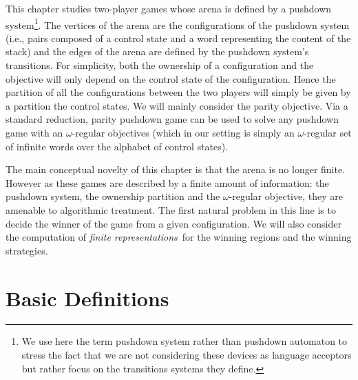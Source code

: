 

This chapter studies two-player games whose arena is defined by a pushdown system\footnote{We use here the term pushdown system rather than pushdown automaton to stress the fact that we are not considering these devices as language acceptors but rather focus on the transitions systems they define.}. The vertices of the arena are the configurations of the pushdown system (i.e., pairs composed of a control state and a word representing the content of the stack) and the edges of the arena are defined by the pushdown system's transitions. For simplicity, both the ownership of a configuration and the objective will only depend on the control state of the configuration. Hence the partition of all the configurations between the two players will simply be given by a partition the control states. We will mainly consider the parity objective. Via a standard reduction, parity pushdown game can be used to solve any pushdown game with an $\omega$-regular objectives (which in our setting is simply an $\omega$-regular set of infinite words over  the alphabet of control states). 

The main conceptual novelty of this chapter is that the arena is no longer finite. However as these games are described by a finite amount of information: the pushdown system, the ownership partition and the $\omega$-regular objective, they are amenable to algorithmic treatment. The first natural problem in this line is to decide the winner of the game from a given configuration. We will also consider the computation of \emph{finite representations} for the winning regions and the winning strategies. 


\section{Basic Definitions}


